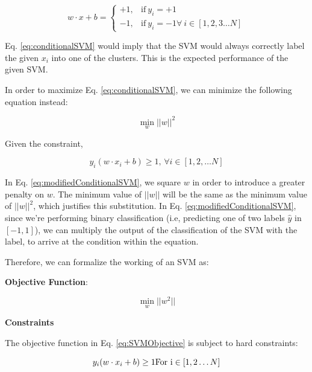 \documentclass[11pt]{article}
\begin{document}
\begin{equation}\label{eq:conditionalSVM}
    w \cdot x + b  = 
    \begin{cases}
    +1, & \text{if}\ y_{i} = +1 \\
    -1, & \text{if}\ y_{i} = -1 \forall\ i \in [1, 2, 3 \dots N]
    \end{cases}
\end{equation}

Eq. \ref{eq:conditionalSVM} would imply that the SVM would always correctly label the given $x_{i}$ into one of the clusters. This is the expected performance of the given SVM.

In order to maximize Eq. \ref{eq:conditionalSVM}, we can minimize the following equation instead:

\begin{equation}\label{eq:modifiedConditionalSVM}
    \min_{w} ||w||^{2}
\end{equation}

Given the constraint,

\begin{equation}\label{eq:modifiedConditionalSVMConstrain}
    y_{i}(w \cdot x_{i} + b) \geq 1 \text{, } \forall i \in [1, 2, \dots N]
\end{equation}

In Eq. \ref{eq:modifiedConditionalSVM}, we square $w$ in order to introduce a greater penalty on $w$. The minimum value of $||w||$ will be the same as the minimum value of $||w||^2$, which justifies this substitution. In Eq. \ref{eq:modifiedConditionalSVM}, since we're performing binary classification (i.e, predicting one of two labels $\hat{y}$ in $[-1, 1]$), we can multiply the output of the classification of the SVM with the label, to arrive at the condition within the equation.

Therefore, we can formalize the working of an SVM as:

\textbf{Objective Function}:

\begin{equation}\label{eq:SVMObjective}
    \min_{w} ||w^2||
\end{equation}

\textbf{Constraints}

The objective function in Eq. \ref{eq:SVMObjective} is subject to hard constraints:

\begin{equation}
    y_{i}(w \cdot x_{i} + b) \geq 1 \\
    \text{For i}  \in [1, 2 \dots N]
\end{equation}
\end{document}
